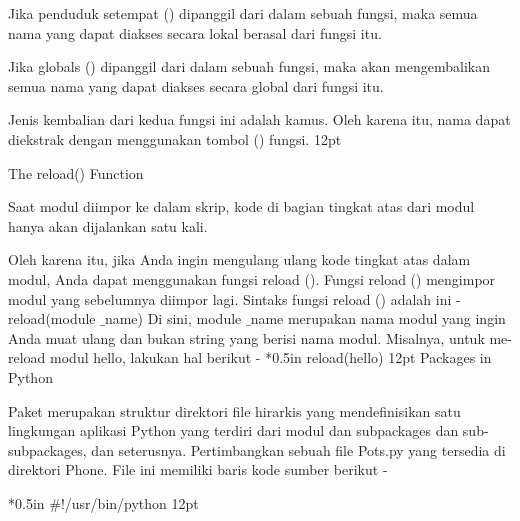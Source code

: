 Jika penduduk setempat () dipanggil dari dalam sebuah fungsi, maka semua nama yang dapat diakses secara lokal berasal dari fungsi itu. 

Jika globals () dipanggil dari dalam sebuah fungsi, maka akan mengembalikan semua nama yang dapat diakses secara global dari fungsi itu. 

Jenis kembalian dari kedua fungsi ini adalah kamus. Oleh karena itu, nama dapat diekstrak dengan menggunakan tombol () fungsi. 
{12pt}

The $  $reload() $  $Function 

Saat modul diimpor ke dalam skrip, kode di bagian tingkat atas dari modul hanya akan dijalankan satu kali. 

Oleh karena itu, jika Anda ingin mengulang ulang kode tingkat atas dalam modul, Anda dapat menggunakan fungsi reload (). Fungsi reload () mengimpor modul yang sebelumnya diimpor lagi. Sintaks fungsi reload () adalah ini - 
 \hspace*{0.5in} reload(module $  \_  $name)
Di sini, module $  \_  $name merupakan nama modul yang ingin Anda muat ulang dan bukan string yang berisi nama modul. Misalnya, untuk me-reload modul hello, lakukan hal berikut - 
 *{0.5in} reload(hello)
{12pt}
\noindent 
Packages in Python 

Paket merupakan struktur direktori file hirarkis yang mendefinisikan satu lingkungan aplikasi Python yang terdiri dari modul dan subpackages dan sub-subpackages, dan seterusnya.
Pertimbangkan sebuah file Pots.py yang tersedia di direktori Phone. File ini memiliki baris kode sumber berikut -

 *{0.5in}  $  \#  $!/usr/bin/python {12pt}

